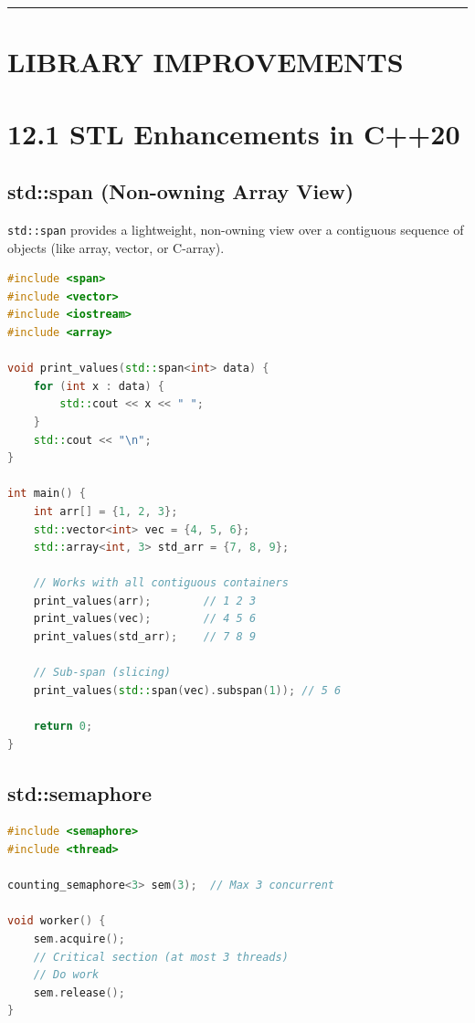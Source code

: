 \begin{center}\rule{0.5\linewidth}{0.5pt}\end{center}

\hypertarget{library-improvements}{%
\section{LIBRARY IMPROVEMENTS}\label{library-improvements}}

\hypertarget{stl-enhancements-in-c20}{%
\section{12.1 STL Enhancements in C++20}\label{stl-enhancements-in-c20}}

\hypertarget{stdspan-non-owning-array-view}{%
\subsection{std::span (Non-owning Array
View)}\label{stdspan-non-owning-array-view}}

\passthrough{\lstinline!std::span!} provides a lightweight, non-owning
view over a contiguous sequence of objects (like array, vector, or
C-array).

\begin{lstlisting}[language={C++}]
#include <span>
#include <vector>
#include <iostream>
#include <array>

void print_values(std::span<int> data) {
    for (int x : data) {
        std::cout << x << " ";
    }
    std::cout << "\n";
}

int main() {
    int arr[] = {1, 2, 3};
    std::vector<int> vec = {4, 5, 6};
    std::array<int, 3> std_arr = {7, 8, 9};

    // Works with all contiguous containers
    print_values(arr);        // 1 2 3
    print_values(vec);        // 4 5 6
    print_values(std_arr);    // 7 8 9
    
    // Sub-span (slicing)
    print_values(std::span(vec).subspan(1)); // 5 6
    
    return 0;
}
\end{lstlisting}

\hypertarget{stdsemaphore}{%
\subsection{std::semaphore}\label{stdsemaphore}}

\begin{lstlisting}[language={C++}]
#include <semaphore>
#include <thread>

counting_semaphore<3> sem(3);  // Max 3 concurrent

void worker() {
    sem.acquire();
    // Critical section (at most 3 threads)
    // Do work
    sem.release();
}
\end{lstlisting}

